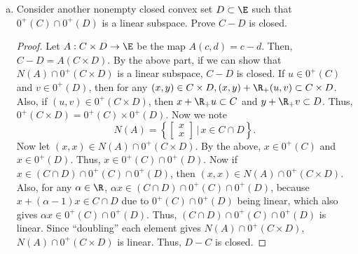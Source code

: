 \documentclass[12pt, letterpaper]{article}
\numberwithin{equation}{subsection}
\begin{document}
\begin{enumerate}[(a)]
\begin{proof}
\begin{equation*}
u^i = A^+y^i \to A^+y.
\end{equation*}
In other words, the sequence $u^i$ has a limit $u=A^+y$. Next, consider 
the sequence $v^i$. If it is bounded, we can take a convergent 
subsequence to obtain $u^i+v^i\to u+v\in C$, which would imply the 
statement. Otherwise, $v^i$ is unbounded (while $u^i$ is bounded). 
We may assume $v^i/\|v^i\|$ converges to $\hat v$; otherwise we can 
take a convergent subsequence. \\
So, $\|u^i+v^i\|\to\infty$ and $\|u^i+v^i\|^{-1}(u^i+v^i)\to \hat v$.
By part (d), we have $\hat v\in 0^+(C)\cap N(A)$. By assumption, 
$-\hat v\in 0^+(C)\cap N(A)$. This allows us to subtract off the 
component of $\hat v$ in each $v^i$, making $v^i$ perpendicular 
to $\hat v$. We repeat this process until 
the sequence $v^i$ is bounded -- the number of repeats is finite, because 
$\E$ is finite dimensional and we are subtracting off an orthogonal 
component each time. Then, we can take a convergent subsequence of 
$v^i$ to obtain $u^i+v^i\to u+v\in C$ satisfying $A(u+v)=y$. \\
This result may fail without the last assumption. Let $A:\R^2\to\R$
be the projection onto the $y$ coordinate, and let $C$ be the closed 
convex set $\{(x,y): x>0, y\geq 1/x\}$.
 0 is a limit point of $AC$, but it is not contained in $AC$.
\end{proof}
\item Consider another nonempty closed convex set $D\subset\E$ such 
that $0^+(C)\cap0^+(D)$ is a linear subspace. Prove $C-D$ is closed.
\begin{proof}
Let $A:C\times D\to \E$ be the map $A(c,d) = c-d$. Then, $C-D = 
A(C\times D)$. By the above part, if we can show that $N(A)\cap 
0^+(C\times D)$ is a linear subspace, $C-D$ is closed. If 
$u\in 0^+(C)$ and $v\in 0^+(D)$, then for any $(x,y)\in C\times D,
(x,y) + \R_+(u, v) \subset C\times D$. Also, if $(u,v)\in0^+(C\times D)$,
then $x+\R_+u\subset C$ and $y+\R_+v\subset D$. Thus, $0^+(C\times D) 
= 0^+(C)\times 0^+(D).$ Now we note 
\begin{equation*}
N(A)  = \left\{\begin{bmatrix} x \\ x \end{bmatrix}\,\bigg|\, 
x\in C\cap D\right\}.
\end{equation*}
Now let $(x,x)\in N(A)\cap 0^+(C\times D)$. By the above, 
$x\in 0^+(C)$ and $x\in 0^+(D)$. Thus, $x\in 0^+(C)\cap 0^+(D)$. 
Now if $x\in (C\cap D)\cap 0^+(C)\cap 0^+(D)$, then $(x,x)\in 
N(A)\cap0^+(C\times D)$. Also, for any $\alpha\in \R$,
 $\alpha x \in (C\cap D)\cap 0^+(C)\cap 
0^+(D)$, because $x + (\alpha-1)x\in C\cap D$ due to $0^+(C)\cap 
0^+(D)$ being linear, which also gives $\alpha x\in 0^+(C)\cap 0^+(D)$. 
Thus, $(C\cap D)\cap 0^+(C)\cap 0^+(D)$ is linear. Since ``doubling''
each element gives $N(A)\cap 0^+(C\times D)$, $N(A)\cap 0^+(C\times D)$ 
is linear. Thus, $D-C$ is closed.
\end{proof}
\end{enumerate}
\end{document}
